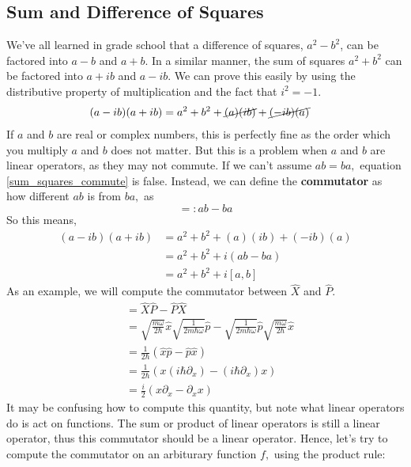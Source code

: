 \subsection{Sum and Difference of Squares}
We've all learned in grade school that a difference of squares, \(a^2-b^2\), can be factored into \(a-b\) and \(a+b.\) In a similar manner, the sum of squares \(a^2+b^2\) can be factored into \(a+ib\) and \(a-ib\). We can prove this easily by using the distributive property of multiplication and the fact that \(i^2=-1.\)
\begin{align}
    (a-ib)(a+ib)&=a^2+b^2+\cancel{(a)(ib)}+\cancel{(-ib)(a)}\label{sum_squares_commute}
\end{align}
If \(a\) and \(b\) are real or complex numbers, this is perfectly fine as the order which you multiply \(a\) and \(b\) does not matter. But this is a problem when \(a\) and \(b\) are linear operators, as they may not commute. If we can't assume \(ab=ba,\) equation \eqref{sum_squares_commute} is false. Instead, we can define the \textbf{commutator} as how different \(ab\) is from \(ba,\) as
\begin{equation}
    [a,b]=:ab-ba
\end{equation}
So this means,
\begin{align}
    (a-ib)(a+ib)&=a^2+b^2+(a)(ib)+(-ib)(a)\\
    &=a^2+b^2+i(ab-ba)\\
    &=a^2+b^2+i[a,b]\label{sum_squares}
\end{align}
As an example, we will compute the commutator between \(\hat X\) and \(\hat P.\)
\begin{align}
    [\hat X,\hat P]&=\hat X\hat P-\hat P\hat X\\
    &=\sqrt{\frac{m\omega}{2\hbar}}\hat x\sqrt{\frac{1}{2m\hbar\omega}}\hat p-\sqrt{\frac{1}{2m\hbar\omega}}\hat p\sqrt{\frac{m\omega}{2\hbar}}\hat x\\
    &=\frac{1}{2\hbar}\left(\hat x\hat p-\hat p\hat x\right)\\
    &=\frac{1}{2\hbar}\left(x(i\hbar\partial_x)-(i\hbar\partial_x)x\right)\\
    &=\frac{i}{2}(x\partial_x-\partial_xx)
\end{align}
It may be confusing how to compute this quantity, but note what linear operators do is act on functions. The sum or product of linear operators is still a linear operator, thus this commutator should be a linear operator. Hence, let's try to compute the commutator on an arbiturary function \(f,\) using the product rule:
